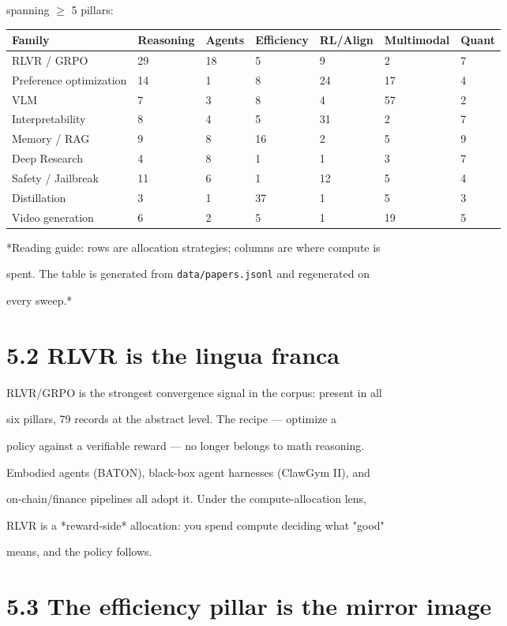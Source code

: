 \documentclass[11pt]{article}
\begin{document}
spanning $\geq$ 5 pillars:


\begin{table}[h]\centering\begin{tabular}{lllllll}
\hline
Family & Reasoning & Agents & Efficiency & RL/Align & Multimodal & Quant \\
\hline
RLVR / GRPO & 29 & 18 & 5 & 9 & 2 & 7 \\
Preference optimization & 14 & 1 & 8 & 24 & 17 & 4 \\
VLM & 7 & 3 & 8 & 4 & 57 & 2 \\
Interpretability & 8 & 4 & 5 & 31 & 2 & 7 \\
Memory / RAG & 9 & 8 & 16 & 2 & 5 & 9 \\
Deep Research & 4 & 8 & 1 & 1 & 3 & 7 \\
Safety / Jailbreak & 11 & 6 & 1 & 12 & 5 & 4 \\
Distillation & 3 & 1 & 37 & 1 & 5 & 3 \\
Video generation & 6 & 2 & 5 & 1 & 19 & 5 \\
\hline\end{tabular}\end{table}


*Reading guide: rows are allocation strategies; columns are where compute is

spent. The table is generated from \texttt{data/papers.jsonl} and regenerated on

every sweep.*


\section{5.2 RLVR is the lingua franca}

RLVR/GRPO is the strongest convergence signal in the corpus: present in all

six pillars, 79 records at the abstract level. The recipe --- optimize a

policy against a verifiable reward --- no longer belongs to math reasoning.

Embodied agents (BATON), black-box agent harnesses (ClawGym II), and

on-chain/finance pipelines all adopt it. Under the compute-allocation lens,

RLVR is a *reward-side* allocation: you spend compute deciding what "good"

means, and the policy follows.


\section{5.3 The efficiency pillar is the mirror image}
\end{document}
